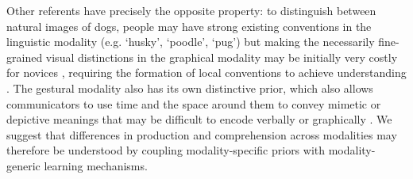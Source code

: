 Other referents have precisely the opposite property: to distinguish between natural images of dogs, people may have strong existing conventions in the linguistic modality (e.g. `husky', `poodle', `pug') but making the necessarily fine-grained visual distinctions in the graphical modality may be initially very costly for novices \cite{fan2020pragmatic}, requiring the formation of local conventions to achieve understanding \cite{hawkins2019disentangling}. 
The gestural modality also has its own distinctive prior, which also allows communicators to use time and the space around them to convey mimetic or depictive meanings that may be difficult to encode verbally or graphically \cite{goldin-meadow_role_1999,clark2016depicting,mcneill1992hand}. 
We suggest that differences in production and comprehension across modalities may therefore be understood by coupling modality-specific priors with modality-generic learning mechanisms.



